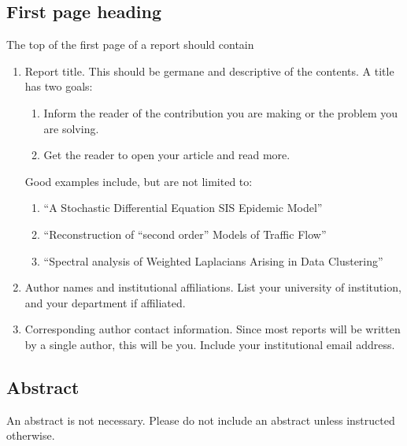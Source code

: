 \documentclass[]{article}
\begin{document}
\subsection{First page heading}
The top of the first page of a report should contain
\begin{enumerate}
    \item Report title. This should be germane and descriptive of the contents. A title has two goals:
          \begin{enumerate}
              \item Inform the reader of the contribution you are making or the problem you are solving.
              \item Get the reader to open your article and read more.
          \end{enumerate}
          Good examples include, but are not limited to:
          \begin{enumerate}
              \item ``A Stochastic Differential Equation SIS Epidemic Model''
              \item ``Reconstruction of ``second order'' Models of Traffic Flow''
              \item ``Spectral analysis of Weighted Laplacians Arising in Data Clustering''
          \end{enumerate}
    \item Author names and institutional affiliations. List your university of institution, and your department if affiliated.
    \item Corresponding author contact information. Since most reports will be written by a single author, this will be you. Include your institutional email address.
\end{enumerate}

\subsection{Abstract}
An abstract is not necessary. Please do not include an abstract unless instructed otherwise.
\end{document}
